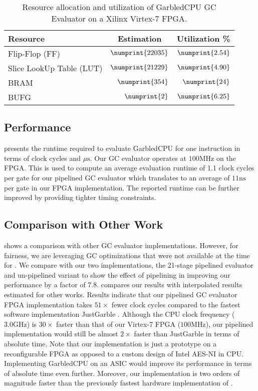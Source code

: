 \begin{table}[ht]
\centering
\caption{Resource allocation and utilization of GarbledCPU GC Evaluator on a Xilinx Virtex-7 FPGA.}
\label{table:resource}
\begin{tabular}{l|r|r}
Resource    & \multicolumn{1}{c|}{Estimation} & \multicolumn{1}{c}{Utilization \%} \\ \hline \hline
Flip-Flop (FF) & $\numprint{22035}$ & $\numprint{2.54}$ \\ \hline
Slice LookUp Table (LUT) & $\numprint{21229}$ & $\numprint{4.90}$ \\ \hline
BRAM & $\numprint{354}$ & $\numprint{24}$
\\ \hline
BUFG & $\numprint{2}$ & $\numprint{6.25}$
 \end{tabular}
\end{table}

\subsection{Performance}  presents the runtime required to evaluate GarbledCPU for one instruction in terms of clock cycles and $\mu\textrm{s}$. Our GC evaluator operates at $100\textrm{MHz}$ on the FPGA. This is used to compute an average evaluation runtime of 1.1 clock cycles per gate for our pipelined GC evaluator which translates to an average of $11\textrm{ns}$ per gate in our FPGA implementation. The reported runtime can be further improved by providing tighter timing constraints.

\subsection{Comparison with Other Work}
 shows a comparison with other GC evaluator implementations. However, for fairness, we are leveraging GC optimizations that were not available at the time for \cite{jarvinen2010garbled}. We compare with our two implementations, the 21-stage pipelined evaluator and un-pipelined variant to show the effect of pipelining in improving our performance by a factor of 7.8.  compares our results with interpolated results estimated for other works. Results indicate that our pipelined GC evaluator FPGA implementation takes $51\times$ fewer clock cycles compared to the fastest software implementation JustGarble \cite{bellare2013efficient}. Although the CPU clock frequency ($3.0\textrm{GHz}$) is $30\times$ faster than that of our Virtex-7 FPGA ($100\textrm{MHz}$), our pipelined implementation would still be almost $2\times$ faster than JustGarble in terms of absolute time. Note that our implementation is just a prototype on a reconfigurable FPGA as opposed to a custom design of Intel AES-NI in CPU. Implementing GarbledCPU on an ASIC would improve its performance in terms of absolute time even further. Moreover, our implementation is two orders of magnitude faster than the previously fastest hardware implementation of \cite{jarvinen2010garbled}.

